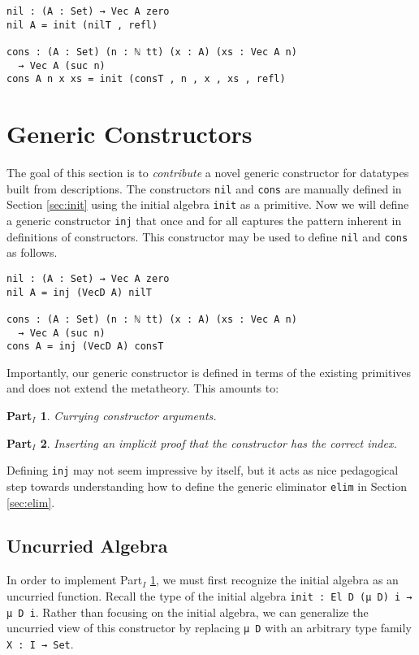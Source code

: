 \documentclass[preprint,nonatbib]{sigplanconf}
\newtheorem{myparti}{Part$_I$}
\newcommand{\refsec}[1]{Section \ref{sec:#1}}
\newcommand{\refparti}[1]{Part$_I$ \ref{parti:#1}}
\begin{document}
\begin{verbatim}
nil : (A : Set) → Vec A zero
nil A = init (nilT , refl)

cons : (A : Set) (n : ℕ tt) (x : A) (xs : Vec A n)
  → Vec A (suc n)
cons A n x xs = init (consT , n , x , xs , refl)
\end{verbatim}

\section{Generic Constructors}
\label{sec:inj}

The goal of this section is to {\it contribute} a novel generic
constructor for datatypes built from descriptions.
The constructors {\tt nil} and {\tt cons} are manually
defined in \refsec{init} using the initial algebra
{\tt init} as a primitive. Now we will define a generic constructor
{\tt inj} that once and for all captures the pattern inherent in
definitions of constructors.  This constructor
may be used to define {\tt nil} and {\tt cons} as follows.

\begin{verbatim}
nil : (A : Set) → Vec A zero
nil A = inj (VecD A) nilT

cons : (A : Set) (n : ℕ tt) (x : A) (xs : Vec A n)
  → Vec A (suc n)
cons A = inj (VecD A) consT
\end{verbatim}

Importantly, our generic constructor is
defined in terms of the existing primitives and does not extend the
metatheory.
This amounts to:

\begin{myparti}
\label{parti:one}
Currying constructor arguments.
\end{myparti}

\begin{myparti}
\label{parti:two}
Inserting an implicit proof that the constructor has the correct index.
\end{myparti}

Defining {\tt inj} may not seem impressive by itself, but it acts as
nice pedagogical step towards understanding how to define the generic
eliminator {\tt elim} in \refsec{elim}.

\subsection{Uncurried Algebra}

In order to implement \refparti{one}, we must first recognize the
initial algebra as an uncurried function. Recall the type of the
initial algebra {\tt init : El D (μ D) i → μ D i}. Rather than
focusing on the initial algebra, we can generalize the uncurried view
of this constructor by replacing {\tt μ D} with an arbitrary
type family {\tt X : I → Set}.
\end{document}
